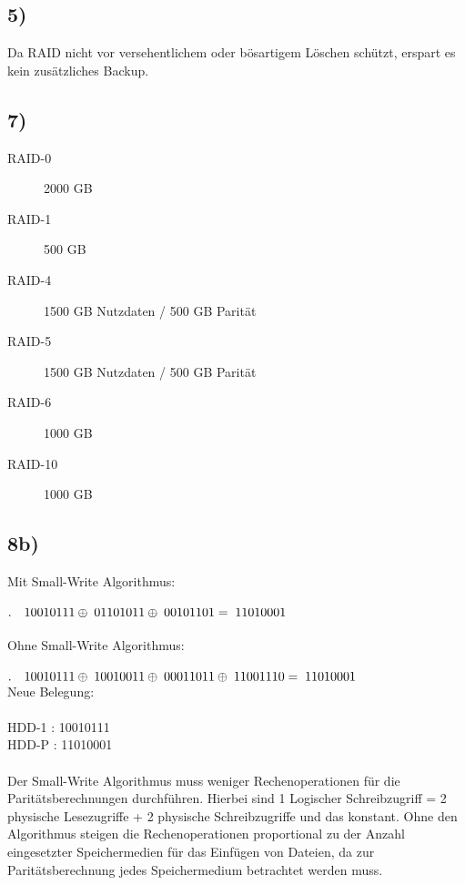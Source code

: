 \documentclass[ngerman]{fbi-aufgabenblatt}
\begin{document}
\subsection*{5)}
Da RAID nicht vor versehentlichem oder bösartigem Löschen schützt, erspart es kein zusätzliches Backup.

\subsection*{7)}
\begin{description}
	\item[RAID-0] 2000 GB
	\item [RAID-1] 500 GB
	\item [RAID-4] 1500 GB Nutzdaten / 500 GB Parität
	\item [RAID-5] 1500 GB Nutzdaten / 500 GB Parität
	\item [RAID-6] 1000 GB
	\item[RAID-10] 1000 GB
\end{description} 

\subsection*{8b)}

Mit Small-Write Algorithmus:\\\\
$.\quad 10010111 \\\oplus \; 01101011 \\ \oplus \; 00101101\\ = \; 11010001$\\\\
Ohne Small-Write Algorithmus:\\\\
$.\quad 10010111 \\\oplus \; 10010011 \\\oplus \; 00011011\\ \oplus \; 11001110 \\= \; 11010001$\\

Neue Belegung:\\\\
HDD-1 : 10010111\\
HDD-P : 11010001\\\\
Der Small-Write Algorithmus muss weniger Rechenoperationen für die Paritätsberechnungen durchführen. Hierbei sind 1 Logischer Schreibzugriff = 2 physische Lesezugriffe + 2 physische Schreibzugriffe und das konstant. Ohne den Algorithmus steigen die Rechenoperationen proportional zu der Anzahl eingesetzter Speichermedien für das Einfügen von Dateien, da zur Paritätsberechnung jedes Speichermedium betrachtet werden muss.
\end{document}
